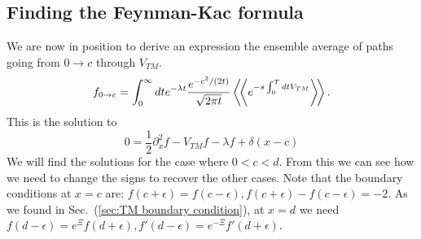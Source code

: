 \subsection{Finding the Feynman-Kac formula}

We are now in position to derive an expression the ensemble average of paths going from $0\rightarrow c$ through $V_{TM}$. 
\begin{equation}
f_{0\rightarrow c}=\int_0^\infty dt e^{-\lambda t}\frac{e^{-c^2/(2t)}}{\sqrt{2\pi t}} \left\langle\!\left\langle e^{-s\int_0^T dt V_{TM}}\right\rangle\!\right\rangle.
\end{equation}
This is the solution to 
\begin{equation}
0 = \frac{1}{2} \partial_x^2 f - V_{TM}f - \lambda f + \delta(x-c)
\end{equation}
We will find the solutions for the case where $0<c<d$.  From this we can see how we need to change the signs to recover the other cases.  Note that the boundary conditions at $x=c$ are: ${f(c+\epsilon)=f(c-\epsilon)}, {f(c+\epsilon)-f(c-\epsilon)= -2}$.  As we found in Sec.~(\ref{sec:TM boundary condition}), at $x=d$ we need $f(d-\epsilon) = e^{\Xi}f(d+\epsilon),f'(d -\epsilon)= e^{-\Xi}f'(d+\epsilon)$.  

